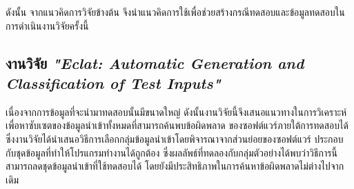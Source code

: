 ดังนั้น จากแนวคิดการวิจัยข้างต้น จึงนำแนวคิดการใช้{\StaticInformation}เพื่อช่วยสร้างกรณีทดสอบและข้อมูลทดสอบในการดำเนินงานวิจัยครั้งนี้

\subsection{งานวิจัย {\it "Eclat: Automatic Generation and Classification of Test Inputs"} \cite{Heaton2000}}
\label{sec:sub:eclat}

เนื่องจากการข้อมูลที่จะนำมาทดสอบนั้นมีขนาดใหญ่ ดังนั้นงานวิจัยนี้จึงเสนอแนวทางในการวิเคราะห์เพื่อหาซับเซตของข้อมูลนำเข้าทั้งหมดที่สามารถค้นพบข้อผิดพลาด
ของซอฟต์แวร์ภายใต้การทดสอบได้ ซึ่งงานวิจัยได้นำเสนอวิธีการเลือกกลุ่มข้อมูลนำเข้าโดยพิจารณาจากส่วนย่อยของซอฟต์แวร์ 
ประกอบกับชุดข้อมูลที่ทำให้โปรแกรมทำงานได้ถูกต้อง ซึ่งผลลัพธ์ที่ทดลองกับกลุ่มตัวอย่างได้พบว่าวิธีการนี้สามารถลดชุดข้อมูลนำเข้าที่ใช้ทดสอบได้
โดยยังมีประสิทธิภาพในการค้นหาข้อผิดพลาดไม่ต่างไปจากเดิม
